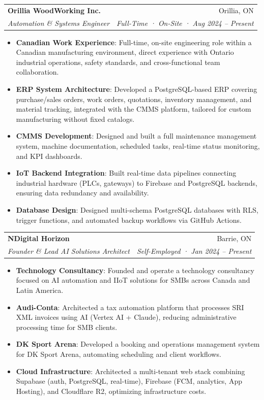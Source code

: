 \documentclass[letterpaper,11pt]{article}
\makeatletter
\newcommand{\resumeItem}[2]{
  \item\small{
    \textbf{#1}{: #2 \vspace{-2pt}}
  }
}
\newcommand{\resumeSubheading}[4]{
  \vspace{-1pt}\item
    \begin{tabular*}{0.97\textwidth}{l@{\extracolsep{\fill}}r}
      \textbf{#1} & #2 \\
      \textit{\small#3} & \textit{\small #4} \\
    \end{tabular*}\vspace{-5pt}
}
\newcommand{\resumeItemListStart}{\begin{itemize}}
\newcommand{\resumeItemListEnd}{\end{itemize}\vspace{-5pt}}
\makeatother
\begin{document}
  \resumeSubheading
    {Orillia WoodWorking Inc.}{Orillia, ON}
    {Automation \& Systems Engineer}{Full-Time · On-Site · Aug 2024 -- Present}
  \resumeItemListStart
    \resumeItem{Canadian Work Experience}
      {Full-time, on-site engineering role within a Canadian manufacturing environment, direct experience with Ontario industrial operations, safety standards, and cross-functional team collaboration.}
    \resumeItem{ERP System Architecture}
      {Developed a PostgreSQL-based ERP covering purchase/sales orders, work orders, quotations, inventory management, and material tracking, integrated with the CMMS platform, tailored for custom manufacturing without fixed catalogs.}
    \resumeItem{CMMS Development}
      {Designed and built a full maintenance management system, machine documentation, scheduled tasks, real-time status monitoring, and KPI dashboards.}
    \resumeItem{IoT Backend Integration}
      {Built real-time data pipelines connecting industrial hardware (PLCs, gateways) to Firebase and PostgreSQL backends, ensuring data redundancy and availability.}
    \resumeItem{Database Design}
      {Designed multi-schema PostgreSQL databases with RLS, trigger functions, and automated backup workflows via GitHub Actions.}
  \resumeItemListEnd

  \resumeSubheading
    {NDigital Horizon}{Barrie, ON}
    {Founder \& Lead AI Solutions Architect}{Self-Employed · Jan 2024 -- Present}
  \resumeItemListStart
    \resumeItem{Technology Consultancy}
      {Founded and operate a technology consultancy focused on AI automation and IIoT solutions for SMBs across Canada and Latin America.}
    \resumeItem{Audi-Conta}
      {Architected a tax automation platform that processes SRI XML invoices using AI (Vertex AI + Claude), reducing administrative processing time for SMB clients.}
    \resumeItem{DK Sport Arena}
      {Developed a booking and operations management system for DK Sport Arena, automating scheduling and client workflows.}
    \resumeItem{Cloud Infrastructure}
      {Architected a multi-tenant web stack combining Supabase (auth, PostgreSQL, real-time), Firebase (FCM, analytics, App Hosting), and Cloudflare R2, optimizing infrastructure costs.}
  \resumeItemListEnd
\end{document}
